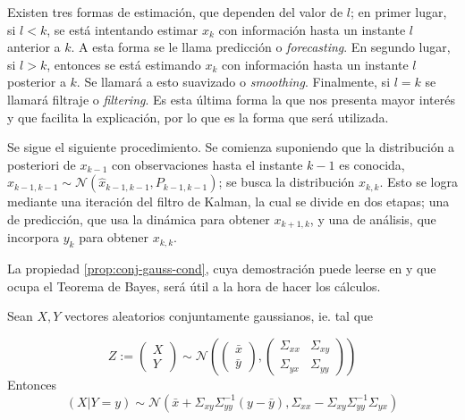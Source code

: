 Existen tres formas de estimación, que dependen del valor de \(l\); en primer lugar, si \(l < k\), se está intentando estimar \(x_k\) con información hasta un instante \(l\) anterior a \(k\). A esta forma se le llama predicción o \textit{forecasting}. En segundo lugar, si \(l>k\), entonces se está estimando \(x_k\) con información hasta un instante \(l\) posterior a \(k\). Se llamará a esto suavizado o \textit{smoothing}. Finalmente, si \(l = k\) se llamará filtraje o \textit{filtering}. Es esta última forma la que nos presenta mayor interés y que facilita la explicación, por lo que es la forma que será utilizada.

Se sigue el siguiente procedimiento. Se comienza suponiendo que la distribución a posteriori de \(x_{k-1}\) con observaciones hasta el instante \(k-1\) es conocida, \(x_{k-1, k-1} \sim \mathcal{N}(\hat{x}_{k-1, k-1}, P_{k-1, k-1})\); se busca la distribución \(x_{k, k}\). Esto se logra mediante una iteración del filtro de Kalman, la cual se divide en dos etapas; una de predicción, que usa la dinámica para obtener \(x_{k+1, k}\), y una de análisis, que incorpora \(y_k\) para obtener \(x_{k, k}\).

La propiedad \ref{prop:conj-gauss-cond}, cuya demostración puede leerse en \cite{Anderson2005} y que ocupa el Teorema de Bayes, será útil a la hora de hacer los cálculos.


\begin{prop}
\label{prop:conj-gauss-cond}
Sean \(X, Y\) vectores aleatorios conjuntamente
gaussianos, ie. tal que

\[
Z := \begin{pmatrix}
X\\
Y
\end{pmatrix} \sim \mathcal{N}\left(
\begin{pmatrix}
\bar{x} \\
\bar{y}
\end{pmatrix}, 
\begin{pmatrix}
\Sigma_{xx} & \Sigma_{xy} \\
\Sigma_{yx} & \Sigma_{yy}
\end{pmatrix}
\right)
\] Entonces \[
(X|Y=y) \sim \mathcal{N} \left( \bar{x} + \Sigma_{xy}\Sigma_{yy}^{-1}(y-\bar{y}),
\Sigma_{xx} - \Sigma_{xy}\Sigma_{yy}^{-1}\Sigma_{yx}
 \right)
\]
\end{prop}


